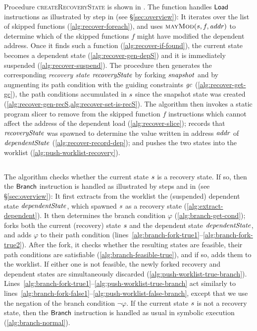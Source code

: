 Procedure \textsc{createRecoveryState} is shown in
. The function handles $\mathsf{Load}$
instructions as illustrated by step  in 
(see \S\ref{sec:overview}): It iterates over the list of skipped
functions (\cref{alg:recover-foreach}), and uses
$\Call{mayMod}{\workstate, f,\addr}$ to determine which of the skipped
functions $f$ might have modified the dependent address. Once it finds
such a function (\cref{alg:recover-if-found}), the current state
becomes a dependent state (\cref{alg:recover-gen-depS}) and it is
immediately suspended (\cref{alg:recover-suspend}). The procedure then
generates the corresponding \emph{recovery state} $\mathit{recoveryState}$ by
forking $\mathit{snapshot}$ and by augmenting its path condition with the
guiding constraints $\mathit{gc}$ (\cref{alg:recover-get-gc}), \ie the path
conditions accumulated in $s$ since the snapshot state was
created (\cref{alg:recover-gen-recS,alg:recover-set-is-recS}). The
algorithm then invokes a static program slicer to remove from the
skipped function $f$ instructions which cannot affect the address of
the dependent load (\cref{alg:recover-slice}); records that
$\mathit{recoveryState}$ was spawned to determine the value written in address
$\mathit{addr}$ of $\mathit{dependentState}$ (\cref{alg:recover-record-dep}); and
pushes the two states into the worklist
(\cref{alg:push-worklist-recovery}).

\subsection{}

The algorithm checks whether the current state $s$ is a
recovery state. If so, then the $\mathsf{Branch}$ instruction is
handled as illustrated by steps  and  in
 (see \S\ref{sec:overview}): It first extracts from
the worklist the (suspended) dependent state $\mathit{dependentState}$, which
spawned $s$ as a recovery state
(\cref{alg:extract-dependent}).  It then determines the branch
condition $\varphi$ (\cref{alg:branch-get-cond}); forks both the
current (recovery) state $s$ and the dependent state
$\mathit{dependentState}$, and adds $\varphi$ to their path condition
(lines~\ref{alg:branch-fork-true1}--\ref{alg:branch-fork-true2}).
After the fork, it checks whether the resulting states are feasible,
\ie their path conditions are satisfiable
(\cref{alg:branch-feasible-true}), and if so, adds them to the
worklist. If either one is not feasible, the newly forked recovery and
dependent states are simultaneously discarded
(\cref{alg:push-worklist-true-branch}).
Lines~\ref{alg:branch-fork-true1}--\ref{alg:push-worklist-true-branch}
act similarly to
lines~\ref{alg:branch-fork-false1}--\ref{alg:push-worklist-false-branch},
except that we use the negation of the branch condition
$\neg\varphi$. If the current state $s$ is not a recovery
state, then the $\mathsf{Branch}$ instruction is handled as usual in
symbolic execution (\cref{alg:branch-normal}).

